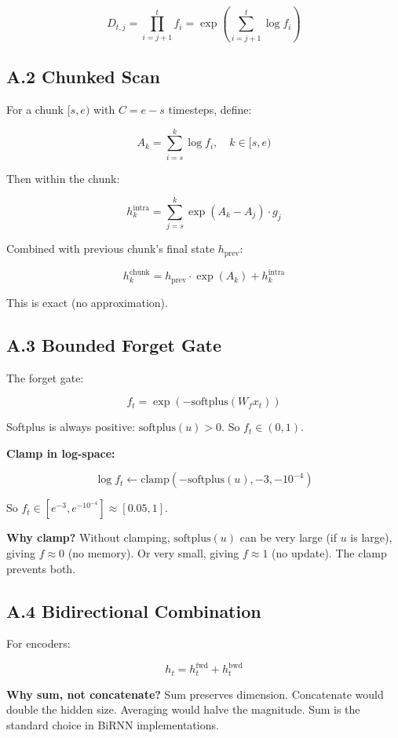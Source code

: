 \[
D_{t, j} = \prod_{i=j+1}^{t} f_i = \exp\left(\sum_{i=j+1}^{t} \log f_i\right)
\tag{A.3}
\]

\subsection{A.2 Chunked Scan}

For a chunk $[s, e)$ with $C = e - s$ timesteps, define:

\[
A_k = \sum_{i=s}^{k} \log f_i, \quad k \in [s, e)
\tag{A.4}
\]

Then within the chunk:

\[
h_k^\text{intra} = \sum_{j=s}^{k} \exp(A_k - A_j) \cdot g_j
\tag{A.5}
\]

Combined with previous chunk's final state $h_\text{prev}$:

\[
h_k^\text{chunk} = h_\text{prev} \cdot \exp(A_k) + h_k^\text{intra}
\tag{A.6}
\]

This is exact (no approximation).

\subsection{A.3 Bounded Forget Gate}

The forget gate:

\[
f_t = \exp(-\text{softplus}(W_f x_t))
\tag{A.7}
\]

Softplus is always positive: $\text{softplus}(u) > 0$. So $f_t \in (0, 1)$.

\textbf{Clamp in log-space:}

\[
\log f_t \leftarrow \text{clamp}(- \text{softplus}(u), -3, -10^{-4})
\tag{A.8}
\]

So $f_t \in [e^{-3}, e^{-10^{-4}}] \approx [0.05, 1]$.

\textbf{Why clamp?} Without clamping, $\text{softplus}(u)$ can be very large (if 
$u$ is large), giving $f \approx 0$ (no memory). Or very small, giving 
$f \approx 1$ (no update). The clamp prevents both.

\subsection{A.4 Bidirectional Combination}

For encoders:

\[
h_t = h_t^\text{fwd} + h_t^\text{bwd}
\tag{A.9}
\]

\textbf{Why sum, not concatenate?} Sum preserves dimension. Concatenate would 
double the hidden size. Averaging would halve the magnitude. Sum is the 
standard choice in BiRNN implementations.

